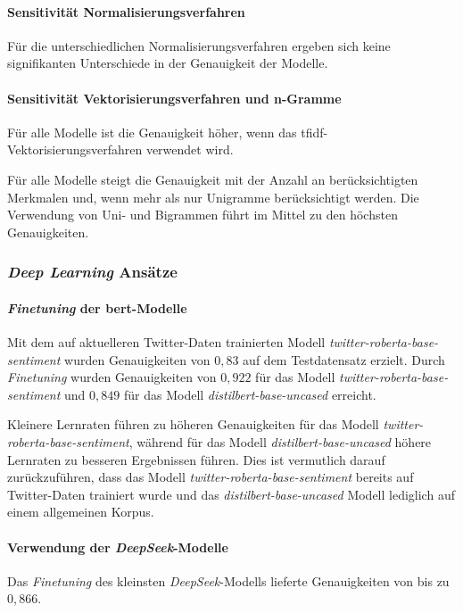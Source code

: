 \paragraph{Sensitivität Normalisierungsverfahren}

Für die unterschiedlichen Normalisierungsverfahren ergeben sich keine signifikanten Unterschiede in der Genauigkeit der Modelle.

\paragraph{Sensitivität Vektorisierungsverfahren und n-Gramme}

Für alle Modelle ist die Ge\-nauig\-keit höher, wenn das \gls{tfidf}-Vektorisierungsverfahren verwendet wird.

Für alle Modelle steigt die Genauigkeit mit der Anzahl an berücksichtigten Merkmalen und, wenn mehr als nur Unigramme berücksichtigt werden.
Die Verwendung von Uni- und Bigrammen führt im Mittel zu den höchsten Genauigkeiten.

\subsubsection{\textit{Deep Learning} Ansätze}\label{subsubsec:ergebnisse-deep-learning-ansaetze}

\paragraph{\textit{Finetuning} der \gls{bert}-Modelle}
Mit dem auf aktuelleren Twitter-Daten trainierten Modell \textit{twitter-roberta-base-sentiment} wurden Genauigkeiten von $0,83$ auf dem Testdatensatz erzielt.
Durch \textit{Finetuning} wurden Genauigkeiten von $0,922$ für das Modell \textit{twitter-roberta-base-sentiment} und $0,849$ für das Modell \textit{distilbert-base-uncased} erreicht.

Kleinere Lernraten führen zu höheren Genauigkeiten für das Modell \textit{twitter-roberta-base-sentiment}, während für das Modell \textit{distilbert-base-uncased} höhere Lernraten zu bes\-se\-ren Ergebnissen führen.
Dies ist vermutlich darauf zurückzuführen, dass das Modell \textit{twitter-roberta-base-sentiment} bereits auf Twitter-Daten trainiert wurde und das \textit{distilbert-base-uncased} Modell lediglich auf einem allgemeinen Korpus.

\paragraph{Verwendung der \textit{DeepSeek}-Modelle}
Das \textit{Finetuning} des kleinsten \textit{DeepSeek}-Modells lieferte Genauigkeiten von bis zu $0,866$.

